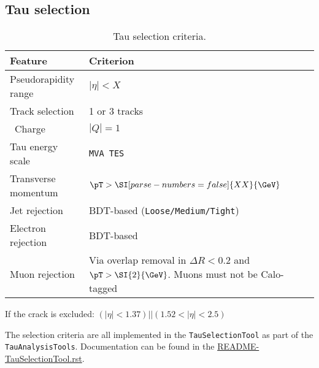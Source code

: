 \subsection{Tau selection}

\begin{table}[ht]
  \caption{Tau selection criteria.}%
  \label{tab:object:tau}
  \centering
  \begin{tabular}{ll}
  \toprule
  Feature & Criterion \\
  \midrule
  Pseudorapidity range & \(|\eta| < X\) \\
  Track selection & 1 or 3 tracks \\\
  Charge & \(|Q| = 1\) \\
  Tau energy scale & \texttt{MVA TES}\\
  Transverse momentum & \(\pT > \SI[parse-numbers=false]{XX}{\GeV}\) \\
  Jet rejection & BDT-based (\texttt{Loose/Medium/Tight}) \\
  Electron rejection & BDT-based\\
  Muon rejection & Via overlap removal in \(\Delta R < 0.2\) and \(\pT > \SI{2}{\GeV}\).
    Muons must not be Calo-tagged\\
  \bottomrule
  \end{tabular}
\end{table}

If the crack is excluded: \((|\eta| < 1.37) || (1.52 < |\eta| < 2.5)\)

The selection criteria are all implemented in the \texttt{TauSelectionTool} as part of the \texttt{TauAnalysisTools}.
Documentation can be found in the \href{https://gitlab.cern.ch/atlas/athena/blob/21.2/PhysicsAnalysis/TauID/TauAnalysisTools/doc/README-TauSelectionTool.rst}{README-TauSelectionTool.rst}.
